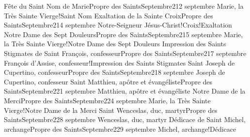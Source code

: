 \documentclass[twoside, french]{book}
\begin{document}
        {Fête du Saint Nom de Marie}{Propre des Saints}{Septembre}{2}{12 septembre}
        {}{}{Marie, la Très Sainte Vierge!Saint Nom}{}{}
        {Exaltation de la Sainte Croix}{Propre des Saints}{Septembre}{2}{14 septembre}
        {}{}{Notre-Seigneur Jésus-Christ!Croix!Exaltation}{}{}
        {Notre Dame des Sept Douleurs}{Propre des Saints}{Septembre}{2}{15 septembre}
        {}{}{Marie, la Très Sainte Vierge!Notre Dame des Sept Douleurs}{}{}
        {Impression des Saints Stigmates de Saint François, confesseur}{Propre des Saints}{Septembre}{2}{17 septembre}
        {}{}{François d’Assise, confesseur!Impression des Saints Stigmates}{}{}
        {Saint Joseph de Cupertino, confesseur}{Propre des Saints}{Septembre}{2}{18 septembre}
        {}{}{Joseph de Cupertino, confesseur}{}{}
        {Saint Matthieu, apôtre et évangéliste}{Propre des Saints}{Septembre}{2}{21 septembre}
        {}{}{Matthieu, apôtre et évangéliste}{}{}
        {Notre Dame de la Merci}{Propre des Saints}{Septembre}{2}{24 septembre}
        {}{}{Marie, la Très Sainte Vierge!Notre Dame de la Merci}{}{}
        {Saint Wenceslas, duc, martyr}{Propre des Saints}{Septembre}{2}{28 septembre}
        {}{}{Wenceslas, duc, martyr}{}{}
        {Dédicace de Saint Michel, archange}{Propre des Saints}{Septembre}{2}{29 septembre}
        {}{}{Michel, archange!Dédicace}{}{}
\end{document}
